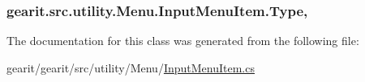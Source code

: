 \hypertarget{classgearit_1_1src_1_1utility_1_1_menu_1_1_input_menu_item_a6fb8a7875b0f6c8f1a6fa9e7ddcbeb7a}{
\subsubsection[{Type}]{ gearit.\+src.\+utility.\+Menu.\+Input\+Menu\+Item.\+Type\hspace{0.3cm}{\ttfamily [get]}, {\ttfamily [set]}}}\label{classgearit_1_1src_1_1utility_1_1_menu_1_1_input_menu_item_a6fb8a7875b0f6c8f1a6fa9e7ddcbeb7a}


The documentation for this class was generated from the following file\+:\begin{DoxyCompactItemize}
\item 
gearit/gearit/src/utility/\+Menu/\hyperlink{_input_menu_item_8cs}{Input\+Menu\+Item.\+cs}\end{DoxyCompactItemize}
